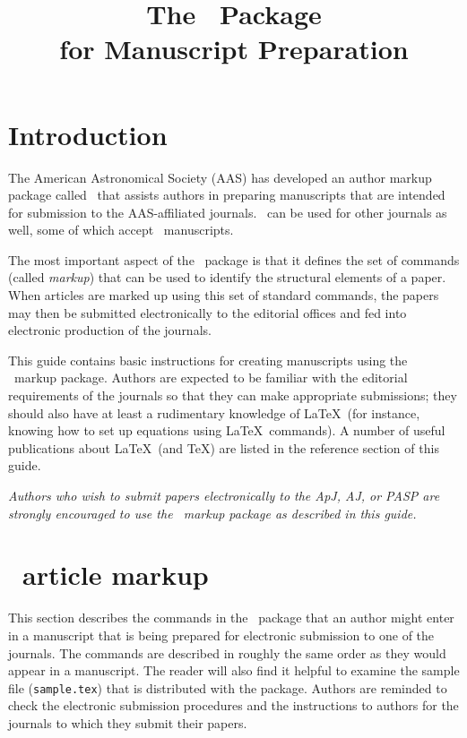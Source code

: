 \documentclass[preprint2]{aastex}
\begin{document}
 
 
\title{The \aastex\ Package\\for Manuscript Preparation} 
 
\tableofcontents 
 
\section{Introduction} 
 
The American Astronomical Society (AAS) has developed an author 
markup package called \aastex\ that assists authors in preparing 
manuscripts that are intended for submission to the AAS-affiliated 
journals.  \aastex\ can be used for other journals as well, 
some of which accept \aastex\ manuscripts. 
 
The most important aspect of the \aastex\ 
package is that it defines the set of commands (called \emph{markup}) 
that can be used to identify the structural elements of a paper. 
When articles are marked up using this set of standard commands, 
the papers may then be submitted electronically to the editorial 
offices and fed into electronic production of the journals. 
 
This guide contains basic instructions for creating 
manuscripts using the \aastex\ markup package. 
Authors are expected to be familiar with the editorial 
requirements of the journals so that they can make 
appropriate submissions; they should also have at least 
a rudimentary knowledge of \LaTeX\ (for instance, knowing 
how to set up equations using \LaTeX\ commands). 
A number of useful publications about \LaTeX\ (and \TeX) are listed in 
the reference section of this guide. 
 
{\em Authors who wish to submit papers electronically to the ApJ, AJ, or 
PASP are strongly encouraged to use the 
\aastex\ markup package as described in this guide.} 
 
\section{\aastex\ article markup} 
 
This section describes the commands in the \aastex\ 
package that an author might enter in a manuscript that is being 
prepared for 
electronic submission to one of the journals. 
The commands are described in roughly the same order as they 
would appear in a manuscript. 
The reader will also find it helpful to examine the 
sample file (\verb"sample.tex") that is 
distributed with the package. 
Authors are reminded to check the electronic submission procedures and 
the instructions to authors for the journals to which they submit their 
papers. 
 
\end{document}
